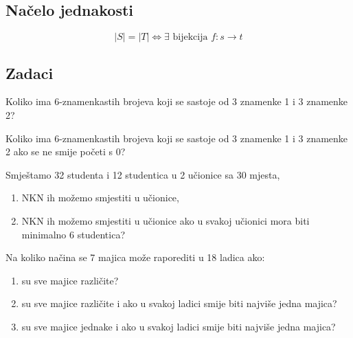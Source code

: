 \subsection{Načelo jednakosti}
$$
    |S| = |T| \iff \exists \text{ bijekcija } f: s \to t
$$

\subsection{Zadaci}

\begin{example}
    Koliko ima 6-znamenkastih brojeva koji se sastoje od 3 znamenke 1 i 3
    znamenke 2?
\end{example}

\begin{example}
    Koliko ima 6-znamenkastih brojeva koji se sastoje od 3 znamenke 1 i 3
    znamenke 2 ako se ne smije početi s 0?
\end{example}

\begin{example}
    Smještamo 32 studenta i 12 studentica u 2 učionice sa 30 mjesta,
    \begin{enumerate}
        \item NKN ih možemo smjestiti u učionice,
        \item NKN ih možemo smjestiti u učionice ako u svakoj učionici mora biti
        minimalno 6 studentica?
    \end{enumerate}
\end{example}

\begin{example}
    Na koliko načina se 7 majica može raporediti u 18 ladica ako:
    \begin{enumerate}
        \item su sve majice različite?
        \item su sve majice različite i ako u svakoj ladici smije biti najviše jedna majica?
        \item su sve majice jednake i ako u svakoj ladici smije biti najviše jedna majica?
    \end{enumerate}
\end{example}
